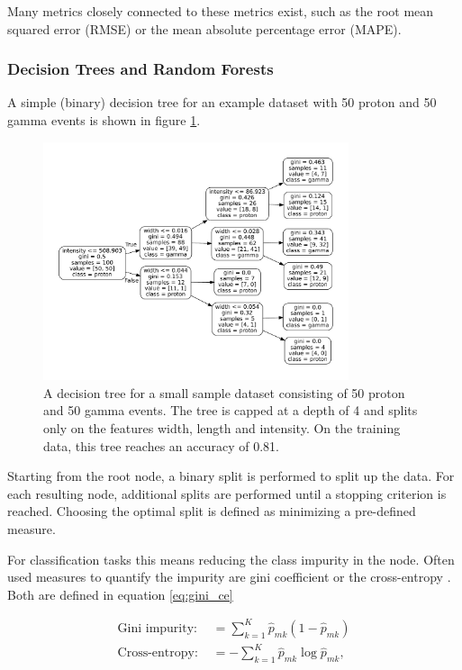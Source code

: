 Many metrics closely connected to these metrics exist, such as the root mean squared error (RMSE)
or the mean absolute percentage error (MAPE).

\subsubsection{Decision Trees and Random Forests}
A simple (binary) decision tree
for an example dataset with 50 proton and 50 gamma
events is shown in figure \ref{fig:03_tree}.

\begin{figure}
  \centering
  \captionsetup{width=0.9\linewidth}
  \includegraphics[width=0.8\textwidth]{Plots/decision_tree.pdf}
  \caption{A decision tree for a small sample dataset consisting of 50 proton and
  50 gamma events. The tree is capped at a depth of 4 and splits only on the 
  features width, length and intensity. On the training data, this tree reaches an
  accuracy of \num{0.81}.}
  \label{fig:03_tree}
\end{figure}

Starting from the root node, a binary split is performed to
split up the data. For each resulting node, additional splits are performed
until a stopping criterion is reached.
Choosing the optimal split is defined as minimizing a
pre-defined measure.

For classification tasks this means reducing the class impurity in the node.
Often used measures
to quantify the impurity are gini coefficient or the
cross-entropy \cite{hastie2017springer}.
Both are defined in equation \ref{eq:gini_ce}

\begin{align}
	\text{Gini impurity: } &= \sum_{k=1}^K \hat{p}_{mk}(1-\hat{p}_{mk}) \\
	\text{Cross-entropy: } &= -\sum_{k=1}^K \hat{p}_{mk}\log{\hat{p}_{mk}},
  \label{eq:gini_ce}
\end{align}

